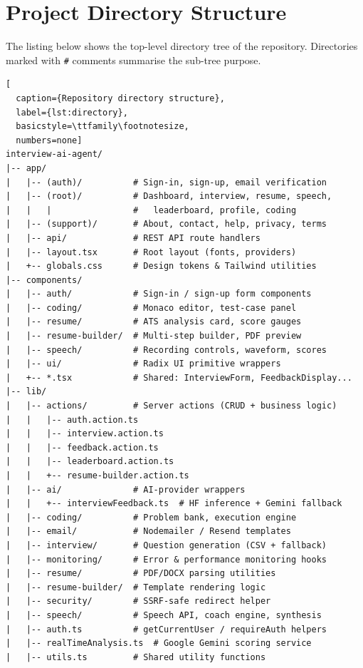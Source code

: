 \section{Project Directory Structure}
\label{app:directory}

The listing below shows the top-level directory tree of the repository.
Directories marked with \texttt{\#} comments summarise the sub-tree purpose.

\begin{lstlisting}[
  caption={Repository directory structure},
  label={lst:directory},
  basicstyle=\ttfamily\footnotesize,
  numbers=none]
interview-ai-agent/
|-- app/
|   |-- (auth)/          # Sign-in, sign-up, email verification
|   |-- (root)/          # Dashboard, interview, resume, speech,
|   |   |                #   leaderboard, profile, coding
|   |-- (support)/       # About, contact, help, privacy, terms
|   |-- api/             # REST API route handlers
|   |-- layout.tsx       # Root layout (fonts, providers)
|   +-- globals.css      # Design tokens & Tailwind utilities
|-- components/
|   |-- auth/            # Sign-in / sign-up form components
|   |-- coding/          # Monaco editor, test-case panel
|   |-- resume/          # ATS analysis card, score gauges
|   |-- resume-builder/  # Multi-step builder, PDF preview
|   |-- speech/          # Recording controls, waveform, scores
|   |-- ui/              # Radix UI primitive wrappers
|   +-- *.tsx            # Shared: InterviewForm, FeedbackDisplay...
|-- lib/
|   |-- actions/         # Server actions (CRUD + business logic)
|   |   |-- auth.action.ts
|   |   |-- interview.action.ts
|   |   |-- feedback.action.ts
|   |   |-- leaderboard.action.ts
|   |   +-- resume-builder.action.ts
|   |-- ai/              # AI-provider wrappers
|   |   +-- interviewFeedback.ts  # HF inference + Gemini fallback
|   |-- coding/          # Problem bank, execution engine
|   |-- email/           # Nodemailer / Resend templates
|   |-- interview/       # Question generation (CSV + fallback)
|   |-- monitoring/      # Error & performance monitoring hooks
|   |-- resume/          # PDF/DOCX parsing utilities
|   |-- resume-builder/  # Template rendering logic
|   |-- security/        # SSRF-safe redirect helper
|   |-- speech/          # Speech API, coach engine, synthesis
|   |-- auth.ts          # getCurrentUser / requireAuth helpers
|   |-- realTimeAnalysis.ts  # Google Gemini scoring service
|   |-- utils.ts         # Shared utility functions

\end{lstlisting}
